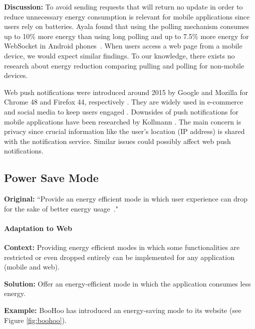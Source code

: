 

\textbf{Discussion:} To avoid sending requests that will return no update in order to reduce unnecessary energy consumption is relevant for mobile applications since users rely on batteries. Ayala \etal found that using the polling mechanism consumes up to 10\% more energy than using long polling and up to 7.5\%  more energy for WebSocket in Android phones~\cite{Ayala2019}. When users access a web page from a mobile device, we would expect similar findings. To our knowledge, there exists no research about energy reduction comparing pulling and polling for non-mobile devices.

Web push notifications were introduced around 2015 by Google and Mozilla for Chrome 48 and Firefox 44, respectively \cite{web-push-notifications}. They are widely used in e-commerce and social media to keep users engaged \cite{blog-web-push-notifications}. Downsides of push notifications for mobile applications have been researched by Kollmann \etal \cite{Kollmann2017}. The main concern is privacy since crucial information like the user's location (\ie IP address) is shared with the notification service. Similar issues could possibly affect web push notifications.

\subsection{Power Save Mode} \label{sec:patterns-PowerSaveMode}
\textbf{Original:} ``Provide an energy efficient mode in which user experience can drop for the sake of better energy usage~\cite{cruz2019catalog}."

\paragraph{Adaptation to Web}\mbox{}

\textbf{Context:} Providing energy efficient modes in which some functionalities are restricted or even dropped entirely can be implemented for any application (mobile and web).

\textbf{Solution:} Offer an energy-efficient mode in which the application consumes less energy.

\textbf{Example:} BooHoo has introduced an energy-saving mode to its website (see Figure \ref{fig:boohoo}).

